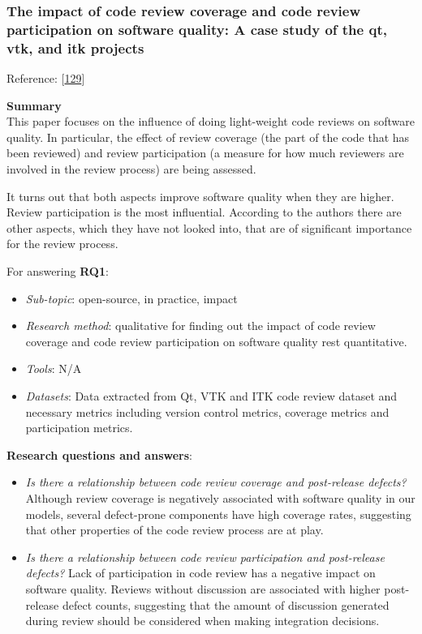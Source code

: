 \documentclass[]{book}
\providecommand{\tightlist}{%
  \setlength{\itemsep}{0pt}\setlength{\parskip}{0pt}}
\begin{document}
\subsubsection{The impact of code review coverage and code review
participation on software quality: A case study of the qt, vtk, and itk
projects}\label{the-impact-of-code-review-coverage-and-code-review-participation-on-software-quality-a-case-study-of-the-qt-vtk-and-itk-projects}

Reference: {[}\protect\hyperlink{ref-mcintosh2014impact}{129}{]}

\textbf{Summary}\\
This paper focuses on the influence of doing light-weight code reviews
on software quality. In particular, the effect of review coverage (the
part of the code that has been reviewed) and review participation (a
measure for how much reviewers are involved in the review process) are
being assessed.

It turns out that both aspects improve software quality when they are
higher. Review participation is the most influential. According to the
authors there are other aspects, which they have not looked into, that
are of significant importance for the review process.

For answering \textbf{RQ1}:

\begin{itemize}
\tightlist
\item
  \emph{Sub-topic}: open-source, in practice, impact
\item
  \emph{Research method}: qualitative for finding out the impact of code
  review coverage and code review participation on software quality rest
  quantitative.
\item
  \emph{Tools}: N/A
\item
  \emph{Datasets}: Data extracted from Qt, VTK and ITK code review
  dataset and necessary metrics including version control metrics,
  coverage metrics and participation metrics.
\end{itemize}

\textbf{Research questions and answers}:

\begin{itemize}
\item
  \emph{Is there a relationship between code review coverage and
  post-release defects?} Although review coverage is negatively
  associated with software quality in our models, several defect-prone
  components have high coverage rates, suggesting that other properties
  of the code review process are at play.
\item
  \emph{Is there a relationship between code review participation and
  post-release defects?} Lack of participation in code review has a
  negative impact on software quality. Reviews without discussion are
  associated with higher post-release defect counts, suggesting that the
  amount of discussion generated during review should be considered when
  making integration decisions.
\end{itemize}
\end{document}
